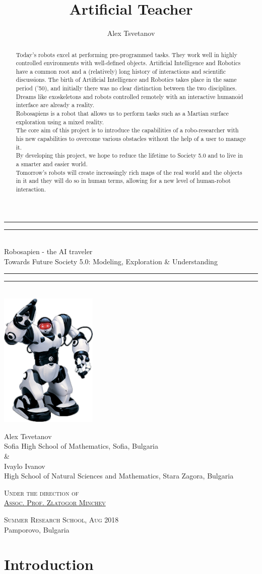 \documentclass[a4paper, 12pt]{article}
\title{Artificial Teacher}
\author{Alex Tsvetanov}
\newcommand{\titleGP}{\begingroup
	\centering
	\rule{\textwidth}{1.6pt}\vspace{-\baselineskip}\vspace{2pt}
	\rule{\textwidth}{0.4pt}\\[\baselineskip]
	
	{\LARGE Robosapien - the AI traveler \\ \small{Towards Future Society 5.0: Modeling, Exploration \& Understanding}}\\[0.2\baselineskip]
	
	\rule{\textwidth}{0.4pt}\vspace{-\baselineskip}\vspace{3.2pt}
	\rule{\textwidth}{1.6pt}\\[\baselineskip]
		\includegraphics[width=0.35\textwidth]{robot.png}
	
	\vspace{50pt}
	{
	{\LARGE Alex Tsvetanov}\\
	{\normalsize Sofia High School of Mathematics, Sofia, Bulgaria}\\\vspace{0.5cm} \& \vspace{0.5cm} \\
	{\LARGE Ivaylo Ivanov}\\
	{\normalsize High School of Natural Sciences and Mathematics, Stara Zagora, Bulgaria}\par}
	
	\vspace{2\baselineskip}
	
	{\scshape \large
		Under the direction of \\
		\hspace{-0.3cm}\href{https://bg.linkedin.com/in/zlatogor-minchev-a101b85}{Assoc. Prof. Zlatogor Minchev} \\\par
	}
	\vspace{1cm}
	
	
	\vfill
	
	{\scshape Summer Research School, Aug 2018} \\[0.3\baselineskip]
	{\large Pamporovo, Bulgaria }\par
	
	\endgroup}
\begin{document}
	
	\titleGP
	\newpage
	
	\tableofcontents
	\newpage
	
	\begin{abstract}
		Today's robots excel at performing pre-programmed tasks. They work well in
		highly controlled environments with well-defined objects. Artificial Intelligence
		and Robotics have a common root and a (relatively) long history of interactions
		and scientific discussions. The birth of Artificial Intelligence and Robotics takes
		place in the same period ('50), and initially there was no clear distinction
		between the two disciplines. Dreams like exoskeletons and robots controlled
		remotely with an interactive humanoid interface are already a reality. \\
		
		Robosapiens is a robot that allows us to perform tasks such as a Martian surface
		exploration using a mixed reality.\\
		
		The core aim of this project is to introduce the capabilities of a robo-researcher with
		his new capabilities to overcome various obstacles without the help of a user to
		manage it.\\
		
		By developing this project, we hope to reduce the lifetime to Society 5.0 and to live in a smarter and easier world. \\
		
		Tomorrow's robots will create increasingly rich maps of the real world and the
		objects in it and they will do so in human terms, allowing for a new level of human-robot interaction.
	\end{abstract}
	\newpage
	
	\section{Introduction}
	
\end{document}
